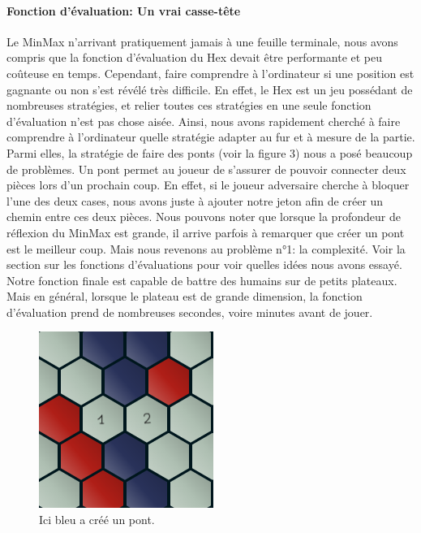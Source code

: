 \paragraph{Fonction d'évaluation: Un vrai casse-tête}
Le MinMax n'arrivant pratiquement jamais à une feuille terminale, nous avons compris que la fonction
d'évaluation du Hex devait être performante et peu coûteuse en temps. Cependant, faire comprendre à l'ordinateur si une position est gagnante
ou non s'est révélé très difficile. En effet, le Hex est un jeu possédant de nombreuses stratégies, et relier toutes ces stratégies en une
seule fonction d'évaluation n'est pas chose aisée. Ainsi, nous avons rapidement cherché à faire comprendre à l'ordinateur
quelle stratégie adapter au fur et à mesure de la partie. Parmi elles, la stratégie de faire des ponts (voir la figure 3) nous a posé beaucoup de problèmes.
Un pont permet au joueur de s'assurer de pouvoir connecter deux pièces lors d'un prochain coup. En effet, si le joueur adversaire cherche à bloquer
l'une des deux cases, nous avons juste à ajouter notre jeton afin de créer un chemin entre ces deux pièces. Nous pouvons noter que lorsque la profondeur de
réflexion du MinMax est grande, il arrive parfois à remarquer que créer un pont est le meilleur coup. Mais nous revenons au problème n°1: la complexité.
Voir la section sur les fonctions d'évaluations pour voir quelles idées nous avons essayé. Notre fonction finale est capable de battre des humains sur de petits 
plateaux. Mais en général, lorsque le plateau est de grande dimension, la fonction d'évaluation prend de nombreuses secondes, voire minutes avant de jouer.

\begin{figure}[h]
    \begin{center}
        \includegraphics[scale=0.5]{root/pont.png}
    \end{center}
    \caption[1]{Ici bleu a créé un pont\footnotemark.}\label{fig:pont_bleu}
\end{figure}

